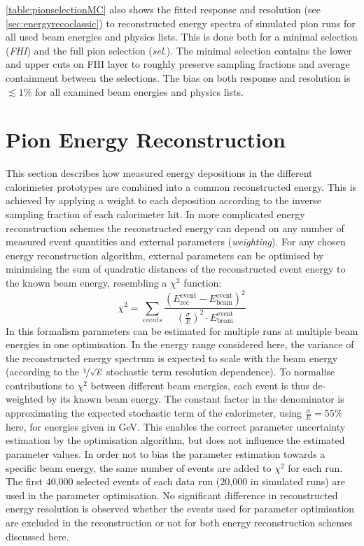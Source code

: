 \documentclass[twoside,a4paper,12pt]{article}
\begin{document}
\autoref{table:pionselectionMC} also shows the fitted response and resolution (see \autoref{sec:energyrecoclassic}) to reconstructed energy spectra of simulated pion runs for all used beam energies and physics lists. This is done both for a minimal selection (\emph{FHI}) and the full pion selection (\emph{sel.}). The minimal selection contains the lower and upper cuts on FHI layer to roughly preserve sampling fractions and average containment between the selections. The bias on both response and resolution is $\lesssim1\%$ for all examined beam energies and physics lists.

\section{Pion Energy Reconstruction}\label{sec:energyreco}
This section describes how measured energy depositions in the different calorimeter prototypes are combined into a common reconstructed energy. This is achieved by applying a weight to each deposition according to the inverse sampling fraction of each calorimeter hit. In more complicated energy reconstruction schemes the reconstructed energy can depend on any number of measured event quantities and external parameters (\emph{weighting}). For any chosen energy reconstruction algorithm, external parameters can be optimised by minimising the sum of quadratic distances of the reconstructed event energy to the known beam energy, resembling a $\chi^2$ function:
\begin{equation}
\chi^2 = \sum_{events}\frac{\left( E_\text{rec}^\text{event}-E_\text{beam}^\text{event}\right )^2}{{\left(\frac{\sigma}{E}\right)}^2\cdot E_\text{beam}^\text{event}}
\end{equation}
In this formalism parameters can be estimated for multiple runs at multiple beam energies in one optimisation. 
In the energy range considered here, the variance of the reconstructed energy spectrum is expected to scale with the beam energy (according to the $\nicefrac{1}{\sqrt{E}}$ stochastic term resolution dependence). 
To normalise contributions to $\chi^2$ between different beam energies, each event is thus de-weighted by its known beam energy. The constant factor in the denominator is approximating the expected stochastic term of the calorimeter, using $\frac{\sigma}{E} = 55\%$ here, for energies given in GeV. This enables the correct parameter uncertainty estimation by the optimisation algorithm, but does not influence the estimated parameter values. In order not to bias the parameter estimation towards a specific beam energy, the same number of events are added to $\chi^2$ for each run. The first 40,000 selected events of each data run (20,000 in simulated runs) are used in the parameter optimisation. No significant difference in reconstructed energy resolution is observed whether the events used for parameter optimisation are excluded in the reconstruction or not for both energy reconstruction schemes discussed here.
\end{document}
